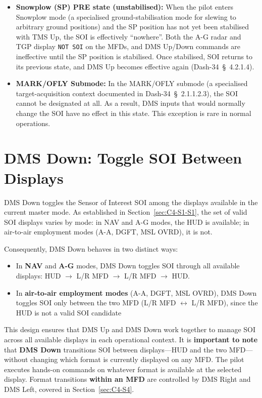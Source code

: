 \documentclass[11pt, a4paper, twoside]{report}
\providecommand{\dashref}[1]{Dash-34~\S~#1}
\begin{document}
\begin{itemize}
	\item \textbf{Snowplow (SP) PRE state (unstabilised):} When the pilot enters Snowplow mode (a specialised ground-stabilisation mode for slewing to arbitrary ground positions) and the SP position has not yet been stabilised with TMS Up, the SOI is effectively ``nowhere''. Both the A-G radar and TGP display \texttt{NOT SOI} on the MFDs, and DMS Up/Down commands are ineffective until the SP position is stabilised. Once stabilised, SOI returns to its previous state, and DMS Up becomes effective again (\dashref{4.2.1.4}).
	\item \textbf{MARK/OFLY Submode:} In the MARK/OFLY submode (a specialised target-acquisition context documented in \dashref{2.1.1.2.3}), the SOI cannot be designated at all. As a result, DMS inputs that would normally change the SOI have no effect in this state. This exception is rare in normal operations.
\end{itemize}

\section{DMS Down: Toggle SOI Between Displays}
\label{sec:C4-S3}

DMS Down toggles the Sensor of Interest SOI among the displays available in the current master mode. As established in Section~\ref{sec:C4-S1-S1}, the set of valid SOI displays varies by mode: in NAV and A-G modes, the HUD is available; in air-to-air employment modes (A-A, DGFT, MSL OVRD), it is not.

Consequently, DMS Down behaves in two distinct ways:

\begin{itemize}
	\item In \textbf{NAV} and \textbf{A-G} modes, DMS Down toggles SOI through all available displays: HUD $\rightarrow$ L/R MFD $\rightarrow$ L/R MFD $\rightarrow$ HUD.
	\item In \textbf{air-to-air employment modes} (A-A, DGFT, MSL OVRD), DMS Down toggles SOI only between the two MFD (L/R MFD $\leftrightarrow$ L/R MFD), since the HUD is not a valid SOI candidate
\end{itemize}

This design ensures that DMS Up and DMS Down work together to manage SOI across all available displays in each operational context. It is \textbf{important to note} that \textbf{DMS Down} transitions SOI between displays—HUD and the two MFD—without changing which format is currently displayed on any MFD. The pilot executes hands-on commands on whatever format is available at the selected display. Format transitions \textbf{within an MFD} are controlled by DMS Right and DMS Left, covered in Section~\ref{sec:C4-S4}.
\end{document}

